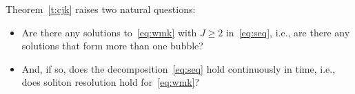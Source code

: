\documentclass[10pt,reqno]{amsart}
\newcommand{\E}{\mathcal{E}}
\newcommand{\HH}{\mathcal{H}}
\newcommand{\fy}{\varphi}
\newcommand{\la}{\lambda}
\newcommand{\EQ}[1]{\begin{equation}\begin{split} #1 \end{split}\end{equation}}
\numberwithin{equation}{section}
\newtheorem{thm}{Theorem}[section]
\theoremstyle{remark}
\newcommand{\mas}{{\ \ \text{as} \ \ }}
\newcommand{\0}{\emptyset}
\begin{document}
Theorem~\ref{t:cjk} raises two natural questions: 
\begin{itemize} 
\item Are there any solutions to~\eqref{eq:wmk} with $J \ge 2$ in~\eqref{eq:seq}, i.e., are there any solutions that form more than one bubble? 
\item And, if so, does the decomposition~\eqref{eq:seq} hold continuously in time, i.e., does soliton resolution hold for~\eqref{eq:wmk}? 
\end{itemize} 

 





%
% 
%
%
%
\end{document}
